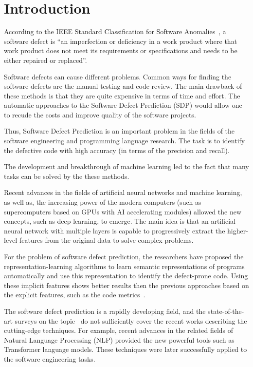 \documentclass[mathematics,review,submit,moreauthors,pdftex]{Definitions/mdpi}
\begin{document}

\section{Introduction}\label{sec_1}

According to the IEEE Standard Classification for Software Anomalies~\cite{ieee_standard}, a software defect is ``an imperfection or deficiency in a work product where that work product does not meet its requirements or specifications and needs to be either repaired or replaced''.

Software defects can cause different problems.
Common ways for finding the software defects are the manual testing and code review. The main drawback of these methods is that they are quite expensive in terms of time and effort. The automatic approaches to the Software Defect Prediction (SDP) would allow one to recude the costs and improve quality of the software projects.

Thus, Software Defect Prediction is an important problem in the fields of the software engineering and programming language research.
The task is to identify the defective code with high accuracy (in terms of the precision and recall).

The development and breakthrough of machine learning led to the fact that many tasks can be solved by the these methods.

Recent advances in the fields of artificial neural networks and machine learning, as well as, the increasing power of the modern computers (such as supercomputers based on GPUs with AI accelerating modules) allowed the new concepts, such as deep learning, to emerge.
The main idea is that an artificial neural network with multiple layers is capable to progressively extract the higher-level features from the original data to solve complex problems.

For the problem of software defect prediction, the researchers have proposed the re\-pre\-sen\-ta\-tion-learning algorithms to learn semantic representations of programs automatically and use this representation to identify the defect-prone code. Using these implicit features shows better results then the previous approaches based on the explicit features, such as the code metrics~\cite{WangEtAl2016}. 

The software defect prediction is a rapidly developing field, and the state-of-the-art surveys on the topic~\cite{OmriSinz2020Survey,yang2020survey,ShenChen2020Survey} do not sufficiently cover the recent works describing the cutting-edge techniques. For example, recent advances in the related fields of Natural Language Processing (NLP) provided the new powerful tools such as Transformer language models. These techniques were later successfully applied to the software engineering tasks. 
\end{document}
